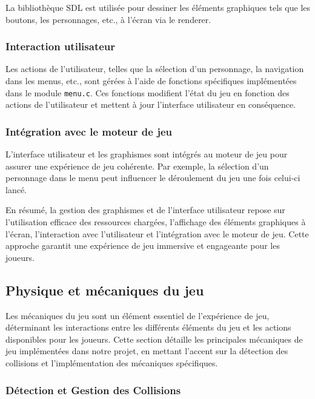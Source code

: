 \documentclass[a4paper,12pt]{article}
\begin{document}
La bibliothèque SDL est utilisée pour dessiner les éléments graphiques tels que les boutons, les personnages, etc., à l'écran via le renderer.
\subsubsection{Interaction utilisateur}

Les actions de l'utilisateur, telles que la sélection d'un personnage, la navigation dans les menus, etc., sont gérées à l'aide de fonctions spécifiques implémentées dans le module \texttt{menu.c}. Ces fonctions modifient l'état du jeu en fonction des actions de l'utilisateur et mettent à jour l'interface utilisateur en conséquence.

\subsubsection{Intégration avec le moteur de jeu}

L'interface utilisateur et les graphismes sont intégrés au moteur de jeu pour assurer une expérience de jeu cohérente. Par exemple, la sélection d'un personnage dans le menu peut influencer le déroulement du jeu une fois celui-ci lancé.

En résumé, la gestion des graphismes et de l'interface utilisateur repose sur l'utilisation efficace des ressources chargées, l'affichage des éléments graphiques à l'écran, l'interaction avec l'utilisateur et l'intégration avec le moteur de jeu. Cette approche garantit une expérience de jeu immersive et engageante pour les joueurs.


\subsection{Physique et mécaniques du jeu}%

Les mécaniques du jeu sont un élément essentiel de l'expérience de jeu, déterminant les interactions entre les différents éléments du jeu et les actions disponibles pour les joueurs. Cette section détaille les principales mécaniques de jeu implémentées dans notre projet, en mettant l'accent sur la détection des collisions et l'implémentation des mécaniques spécifiques.

\subsubsection{Détection et Gestion des Collisions}
\end{document}
